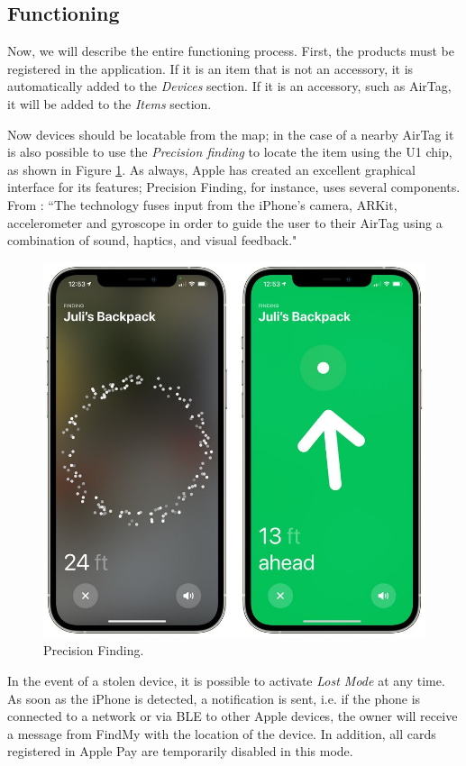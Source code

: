 \documentclass[english]{article}
\begin{document}
\subsection{Functioning}
Now, we will describe the entire functioning process. First, the products must be registered in the application. If it is an item that is not an accessory, it is automatically added to the \textit{Devices} section. If it is an accessory, such as AirTag, it will be added to the \textit{Items} section.

Now devices should be locatable from the map; in the case of a nearby AirTag it is also possible to use the \textit{Precision finding} to locate the item using the U1 chip, as shown in Figure \ref{findmy1}. As always, Apple has created an excellent graphical interface for its features; Precision Finding, for instance, uses several components. From \cite{OBoyle_2021}: ``The technology fuses input from the iPhone's camera, ARKit, accelerometer and gyroscope in order to guide the user to their AirTag using a combination of sound, haptics, and visual feedback." 

\begin{figure}[t]
	\centering
	\includegraphics[width=.6\textwidth]{images/airtag-precision-finding-2.jpg}
	\caption{Precision Finding.}
	\label{findmy1}
\end{figure}

In the event of a stolen device, it is possible to activate \textit{Lost Mode} at any time. As soon as the iPhone is detected, a notification is sent, i.e. if the phone is connected to a network or via BLE to other Apple devices, the owner will receive a message from FindMy with the location of the device. In addition, all cards registered in Apple Pay are temporarily disabled in this mode.
\end{document}

